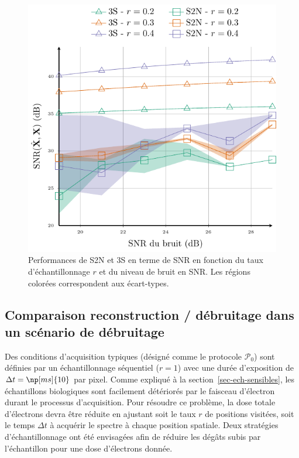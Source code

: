 \begin{figure}[h!]
    \centering
    \includegraphics{img/chapitre3/figure6/pix_ratio.pdf}
    \caption{Performances de S2N et 3S en terme de SNR en fonction du taux d'échantillonnage $r$ et du niveau de bruit en SNR. Les régions colorées correspondent aux écart-types. 
        \protect\label{fig-s2n-3s-noise-ratio}}
\end{figure}

\subsection{Comparaison reconstruction / débruitage dans un scénario de débruitage}\label{sec-lr-demelange-res}

Des conditions d'acquisition typiques (désigné comme le protocole $\mathcal{P}_0$) sont définies par un échantillonnage séquentiel ($r=1$) avec une durée d'exposition de $\Delta t = \np[ms]{10}$ par pixel. Comme expliqué à la section~\ref{sec-ech-sensibles}, les échantillons biologiques sont facilement détériorés par le faisceau d'électron durant le processus d'acquisition.  Pour résoudre ce problème, la dose totale d'électrons devra être réduite en ajustant soit le taux $r$ de positions visitées, soit le temps $\Delta t$ à acquérir le spectre à chaque position spatiale.
Deux stratégies d'échantillonnage ont été envisagées afin de réduire les dégâts subis par l'échantillon pour une dose d'électrons donnée.

